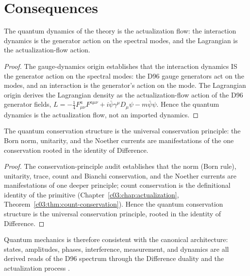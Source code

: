 \section{Consequences}
\label{c09:sec:qm-consequences}

\begin{lemma}
\label{c09:lem:qm-dynamics}
The quantum dynamics of the theory is the actualization flow: the interaction dynamics is
the generator action on the spectral modes, and the Lagrangian is the actualization-flow
action.
\end{lemma}

\begin{proof}
The gauge-dynamics origin \cite{c09:QG243} establishes that the interaction dynamics IS the
generator action on the spectral modes: the D96 gauge generators act on the modes, and an
interaction is the generator's action on the mode. The Lagrangian origin \cite{c09:QG244}
derives the Lagrangian density as the actualization-flow action of the D96 generator
fields, $L = -\frac{1}{4}F^a_{\mu\nu}F^{a\mu\nu} + i\bar{\psi}\gamma^\mu D_\mu\psi -
m\bar{\psi}\psi$. Hence the quantum dynamics is the actualization flow, not an imported
dynamics.
\end{proof}

\begin{theorem}
\label{c09:thm:qm-conservation}
The quantum conservation structure is the universal conservation principle: the Born norm,
unitarity, and the Noether currents are manifestations of the one conservation rooted in the
identity of Difference.
\end{theorem}

\begin{proof}
The conservation-principle audit \cite{c09:QG267} establishes that the norm (Born rule),
unitarity, trace, count and Bianchi conservation, and the Noether currents are
manifestations of one deeper principle; count conservation is the definitional identity of
the primitive (Chapter~\ref{c03:chap:actualization},
Theorem~\ref{c03:thm:count-conservation}). Hence the quantum conservation structure is the
universal conservation principle, rooted in the identity of Difference.
\end{proof}

Quantum mechanics is therefore consistent with the canonical architecture: states,
amplitudes, phases, interference, measurement, and dynamics are all derived reads of the
D96 spectrum through the Difference duality and the actualization process
\cite{c09:QG286,c09:QG223}.

